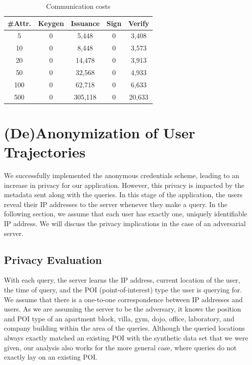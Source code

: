 \documentclass[9pt,conference]{IEEEtran}
\begin{document}
\begin{table}
\caption{Communication costs}
\centering
\label{communication}
\begin{tabular}{ccccc}
\textbf{\#Attr.} & \textbf{Keygen} & \textbf{Issuance} & \textbf{Sign} & \textbf{Verify} \\ \hline
5                & 0               & 5,448             & 0             & 3,408           \\
10               & 0               & 8,448             & 0             & 3,573           \\
20               & 0               & 14,478            & 0             & 3,913           \\
50               & 0               & 32,568            & 0             & 4,933           \\
100              & 0               & 62,718            & 0             & 6,633           \\
500              & 0               & 305,118           & 0             & 20,633         
\end{tabular}
\end{table}

\section{(De)Anonymization of User Trajectories}
\label{sec:priv}

We successfully implemented the anonymous credentials scheme, leading to an increase in privacy for our application. However, this privacy is impacted by the metadata sent along with the queries. In this stage of the application, the users reveal their IP addresses to the server whenever they make a query. In the following section, we assume that each user has exactly one, uniquely identifiable IP address. We will discuss the privacy implications in the case of an adversarial server.

\subsection{Privacy Evaluation}
With each query, the server learns the IP address, current location of the user, the time of query, and the POI (point-of-interest) type the user is querying for. We assume that there is a one-to-one correspondence between IP addresses and users. As we are assuming the server to be the adversary, it knows the position and POI type of an apartment block, villa, gym, dojo, office, laboratory, and company building within the area of the queries. Although the queried locations always exactly matched an existing POI with the synthetic data set that we were given, our analysis also works for the more general case, where queries do not exactly lay on an existing POI.
\end{document}
